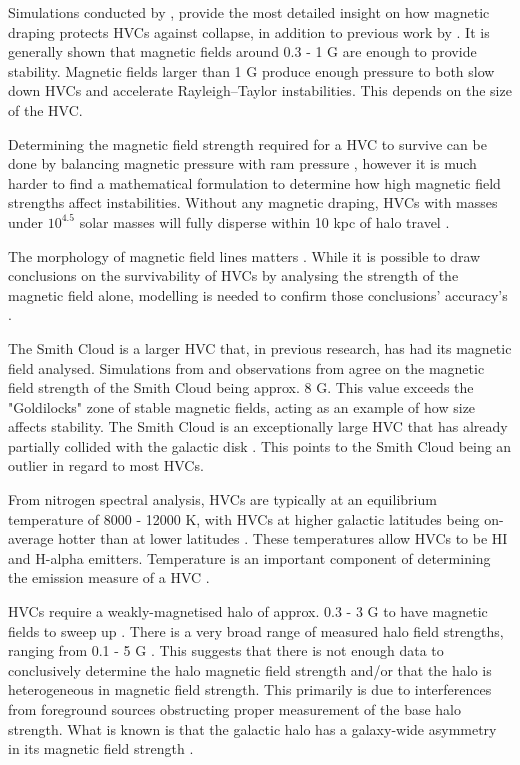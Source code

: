Simulations conducted by \citep{ID23, ID24, ID33}, provide the most detailed insight on how magnetic draping protects HVCs against collapse, in addition to previous work by \citep{ID11, ID13, ID25}. It is generally shown that magnetic fields around 0.3 - 1 {\textmu}G are enough to provide stability. Magnetic fields larger than 1 {\textmu}G produce enough pressure to both slow down HVCs and accelerate Rayleigh–Taylor instabilities. This depends on the size of the HVC.

Determining the magnetic field strength required for a HVC to survive can be done by balancing magnetic pressure with ram pressure \cite{ID13}, however it is much harder to find a mathematical formulation to determine how high magnetic field strengths affect instabilities. Without any magnetic draping, HVCs with masses under $10^4.5$ solar masses will fully disperse within 10 kpc of halo travel \cite{ID25}.

The morphology of magnetic field lines matters \cite{ID24}. While it is possible to draw conclusions on the survivability of HVCs by analysing the strength of the magnetic field alone, modelling is needed to confirm those conclusions' accuracy's \cite{ID5}.

The Smith Cloud is a larger HVC that, in previous research, has had its magnetic field analysed. Simulations from \citep{ID23} and observations from \citep{ID28} agree on the magnetic field strength of the Smith Cloud being approx. 8 {\textmu}G. This value exceeds the "Goldilocks" zone of stable magnetic fields, acting as an example of how size affects stability. The Smith Cloud is an exceptionally large HVC that has already partially collided with the galactic disk \cite{ID28, ID35}. This points to the Smith Cloud being an outlier in regard to most HVCs.

From nitrogen spectral analysis, HVCs are typically at an equilibrium temperature of 8000 - 12000 K, with HVCs at higher galactic latitudes being on-average hotter than at lower latitudes \cite{ID48, ID49}. These temperatures allow HVCs to be HI and H-alpha emitters. Temperature is an important component of determining the emission measure of a HVC \cite{ID5, ID26, ID30}.

HVCs require a weakly-magnetised halo of approx. 0.3 - 3 {\textmu}G to have magnetic fields to sweep up \cite{ID13}. There is a very broad range of measured halo field strengths, ranging from 0.1 - 5 {\textmu}G \cite{ID4, ID16, ID21, ID30, ID37, ID42}. This suggests that there is not enough data to conclusively determine the halo magnetic field strength and/or that the halo is heterogeneous in magnetic field strength. This primarily is due to interferences from foreground sources obstructing proper measurement of the base halo strength. What is known is that the galactic halo has a galaxy-wide asymmetry in its magnetic field strength \cite{ID16, ID30, ID21}.

